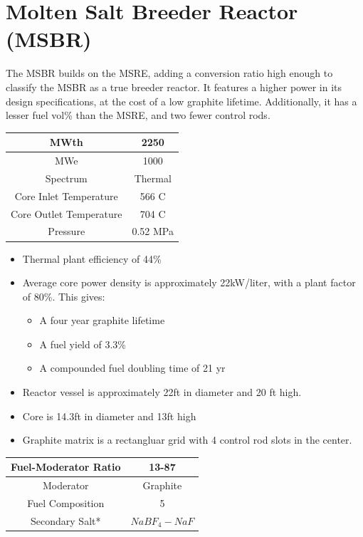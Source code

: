 \documentclass[letterpaper]{article}
\begin{document}
\section{Molten Salt Breeder Reactor (MSBR)}
The MSBR builds on the MSRE, adding a conversion ratio high enough to classify the MSBR as a true breeder reactor.  It features a higher power in its design specifications, at the cost of a low graphite lifetime.  Additionally, it has a lesser fuel vol\% than the MSRE, and two fewer control rods.

\begin{center}
\begin{tabular}{|c|c|}
\hline
MWth & 2250 \\
\hline
MWe & 1000 \\
\hline
Spectrum & Thermal \\
\hline
Core Inlet Temperature & 566 C \\
\hline
Core Outlet Temperature & 704 C\\
\hline
Pressure & 0.52 MPa \\
\hline
\end{tabular}
\end{center}

\begin{itemize}
\item Thermal plant efficiency of 44\%
\item Average core power density is approximately 22kW/liter, with a plant factor of 80\%.  This gives:
	\begin{itemize}
	\item A four year graphite lifetime
	\item A fuel yield of 3.3\%
	\item A compounded fuel doubling time of 21 yr
	\end{itemize}
\item Reactor vessel is approximately 22ft in diameter and 20 ft high.
\item Core is 14.3ft in diameter and 13ft high
\item Graphite matrix is a rectangluar grid with 4 control rod slots in the center.
\end{itemize}

\begin{center}
\begin{tabular}{|c|c|}
\hline
Fuel-Moderator Ratio & 13-87 \\
\hline
Moderator & Graphite \\
\hline
Fuel Composition & 5 \\
\hline
Secondary Salt* & $NaBF_4-NaF$ \\
\hline
\end{tabular}
\end{center}
\end{document}

